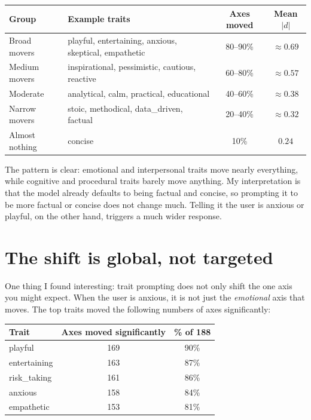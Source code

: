 \documentclass[11pt]{article}
\begin{document}
\begin{center}
\begin{tabular}{llcc}
\toprule
Group & Example traits & Axes moved & Mean $|d|$ \\
\midrule
Broad movers   & playful, entertaining, anxious, skeptical, empathetic & 80--90\% & $\approx 0.69$ \\
Medium movers  & inspirational, pessimistic, cautious, reactive         & 60--80\% & $\approx 0.57$ \\
Moderate       & analytical, calm, practical, educational               & 40--60\% & $\approx 0.38$ \\
Narrow movers  & stoic, methodical, data\_driven, factual               & 20--40\% & $\approx 0.32$ \\
Almost nothing & concise                                                & 10\%     & $0.24$         \\
\bottomrule
\end{tabular}
\end{center}

The pattern is clear: emotional and interpersonal traits move nearly everything, while cognitive and procedural traits barely move anything. My interpretation is that the model already defaults to being factual and concise, so prompting it to be more factual or concise does not change much. Telling it the user is anxious or playful, on the other hand, triggers a much wider response.

\section*{The shift is global, not targeted}

One thing I found interesting: trait prompting does not only shift the one axis you might expect. When the user is anxious, it is not just the \textit{emotional} axis that moves. The top traits moved the following numbers of axes significantly:

\begin{center}
\begin{tabular}{lcc}
\toprule
Trait & Axes moved significantly & \% of 188 \\
\midrule
playful      & 169 & 90\% \\
entertaining & 163 & 87\% \\
risk\_taking & 161 & 86\% \\
anxious      & 158 & 84\% \\
empathetic   & 153 & 81\% \\
\bottomrule
\end{tabular}
\end{center}
\end{document}
